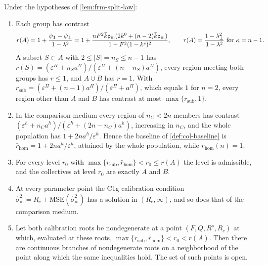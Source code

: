 \begin{theorem}\label{thm:frm-split-contrast}
Under the hypotheses of \cref{lem:frm-split-law}:
\begin{enumerate}
\item[(a)] Each group has contrast
\begin{equation}\label{eq:frm-contrast}
r(A)=1+\frac{\psi_{\mathbf{1}}-\psi_\perp}{1-\lambda^2}=1+\frac{nF^2\bar k\mathsf p_{\mathrm{in}}(2k^0+(n-2)\bar k\mathsf p_{\mathrm{in}})}{1-F^2(1-k^s)^2},\qquad r(A)=\frac{1-\lambda_\perp^2}{1-\lambda^2}\text{ for }\kappa=n-1.
\end{equation}
A subset $S\subset A$ with $2\le\vert S\vert=n_S\le n-1$ has $r(S)=(\varepsilon^\Pi+n_Sa^\Pi)/(\varepsilon^\Pi+(n-n_S)a^\Pi)$, every region meeting both groups has $r\le1$, and $A\cup B$ has $r=1$. With $r_{\mathrm{sub}}=(\varepsilon^\Pi+(n-1)a^\Pi)/(\varepsilon^\Pi+a^\Pi)$, which equals $1$ for $n=2$, every region other than $A$ and $B$ has contrast at most $\max\{r_{\mathrm{sub}},1\}$.
\item[(b)] In the comparison medium every region of $n_C<2n$ members has contrast $(\varepsilon^h+n_Ca^h)/(\varepsilon^h+(2n-n_C)a^h)$, increasing in $n_C$, and the whole population has $1+2na^h/\varepsilon^h$. Hence the baseline of \cref{def:col-baseline} is $\bar r_{\mathrm{hom}}=1+2na^h/\varepsilon^h$, attained by the whole population, while $r_{\mathrm{hom}}(n)=1$.
\item[(c)] For every level $r_0$ with $\max\{r_{\mathrm{sub}},\bar r_{\mathrm{hom}}\}<r_0\le r(A)$ the level is admissible, and the collectives at level $r_0$ are exactly $A$ and $B$.
\item[(d)] At every parameter point the C1g calibration condition $\hat\sigma^2_{\mathrm{in}}=R_c+\mathrm{MSE}(\hat\sigma^2_{\mathrm{in}})$ has a solution in $(R_c,\infty)$, and so does that of the comparison medium.
\item[(e)] Let both calibration roots be nondegenerate at a point $(F,Q,R^s,R_c)$ at which, evaluated at these roots, $\max\{r_{\mathrm{sub}},\bar r_{\mathrm{hom}}\}<r_0<r(A)$. Then there are continuous branches of nondegenerate roots on a neighborhood of the point along which the same inequalities hold. The set of such points is open.
\end{enumerate}
\end{theorem}
